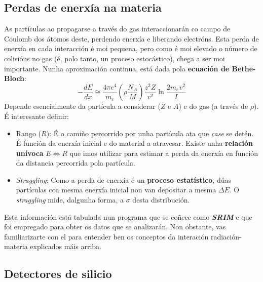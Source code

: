 \documentclass[11pt, a4paper]{article}
\begin{document}
\subsection{Perdas de enerxía na materia}\label{sec:de}
As partículas ao propagarse a través do gas interaccionarán co campo de Coulomb dos átomos deste, perdendo enerxía e liberando electróns. Esta perda de enerxía en cada interacción é moi pequena, pero como é moi elevado o número de colisións no gas (é, polo tanto, un proceso estocástico), chega a ser moi importante. Nunha aproximación continua, está dada pola \textbf{ecuación de Bethe-Bloch}:
\begin{equation*}\label{eq:stopping}
    - \frac{dE}{dx} \cong \frac{4 \pi e^4}{m_e} \left(\rho \frac{N_A}{M}\right)\frac{z^2 Z}{v^2} \ln{\frac{2m_e v^2}{I}}
\end{equation*}
Depende esencialmente da partícula a considerar ($Z$ e $A$) e do gas (a través de $\rho$). É interesante definir:
\begin{itemize}
    \item Rango ($R$): É o camiño percorrido por unha partícula ata que \textit{case} se detén. É función da enerxía inicial e do material a atravesar. Existe unha \textbf{relación unívoca} $E \Longleftrightarrow R$ que imos utilizar para estimar a perda da enerxía en función da distancia percorrida pola partícula.
    \item \textit{Straggling}: Como a perda de enerxía é un \textbf{proceso estatístico}, dúas partículas coa mesma enerxía inicial non van depositar a mesma $\Delta E$. O \textit{straggling} mide, dalgunha forma, a $\sigma$ desta distribución.
\end{itemize}
Esta información está tabulada nun programa que se coñece como \textit{\textbf{SRIM}} e que foi empregado para obter os datos que se analizarán. Non obstante, vas familiarizarte con el para entender ben os conceptos da interación radiación-materia explicados máis arriba.

\subsection{Detectores de silicio}
\end{document}
